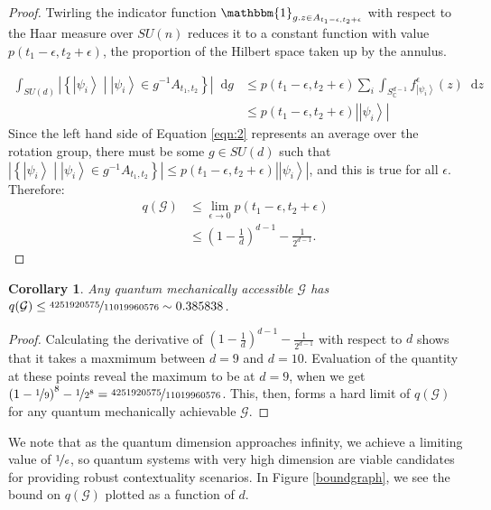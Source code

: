\documentclass{amsart}
\newtheorem{cor}{Corollary}
\theoremstyle{definition}
\newcommand{\ket}[1]{{\left\vert{#1}\right\rangle}}
\newcommand*\dif{\mathop{}\!\mathrm{d}}
\begin{document}
\begin{proof}
Twirling the indicator function $ \mathbbm{1}_{g.z\in A_{t_1-\epsilon,t_2+\epsilon}}$ with respect to the Haar measure over $SU(n)$ reduces it to a constant function with value $p(t_1-\epsilon,t_2+\epsilon)$, the proportion of the Hilbert space taken up by the annulus.

\begin{align}
\int_{SU(d)} \left|\left\{\ket{\psi_i} \middle| \ket{\psi_i} \in g^{-1}A_{t_1,t_2}\right\}\right| \dif g &\leq p(t_1-\epsilon,t_2+\epsilon)\sum_i\int_{S_\mathbb{C}^{d-1}}f^\epsilon_\ket{\psi_i}(z)  \dif z \label{eqn:2}\\
&\leq p(t_1-\epsilon,t_2+\epsilon)\left|\ket{\psi_i}\right|
\end{align}
Since the left hand side of Equation \ref{eqn:2} represents an average over the rotation group, there must be some $g\in SU(d)$ such that $\left|\left\{\ket{\psi_i} \middle| \ket{\psi_i} \in g^{-1}A_{t_1,t_2}\right\}\right|\leq p(t_1-\epsilon,t_2+\epsilon)\left|\ket{\psi_i}\right|$, and this is true for all $\epsilon$. Therefore:
\begin{align}
q(\mathcal{G})&\leq \lim_{\epsilon\rightarrow0}p(t_1-\epsilon,t_2+\epsilon) \\
&\leq \left(1-\frac1d\right)^{d-1}-\frac{1}{2^{d-1}}.
\end{align}

\end{proof} 
\begin{cor}
Any quantum mechanically accessible $\mathcal{G}$ has  $q(\mathcal{G})\leq\nicefrac{4251920575}{11019960576}\sim0.385838$.
\end{cor}
\begin{proof}
Calculating the derivative of $ \left(1-\frac1d\right)^{d-1}-\frac{1}{2^{d-1}}$ with respect to $d$ shows that it takes a maxmimum between $d=9$ and $d=10$. Evaluation of the quantity at these points reveal the maximum to be at $d=9$, when we get $\left(1-\nicefrac19\right)^{8}-\nicefrac{1}{2^{8}}=\nicefrac{4251920575}{11019960576}$. This, then, forms a hard limit of $q(\mathcal{G})$ for any quantum mechanically achievable $\mathcal{G}$.
\end{proof}
We note that as the quantum dimension approaches infinity, we achieve a limiting value of $\nicefrac1e$, so quantum systems with very high dimension are viable candidates for providing robust contextuality scenarios. In Figure \ref{boundgraph}, we see the bound on $q(\mathcal{G})$ plotted as a function of $d$.
\end{document}
